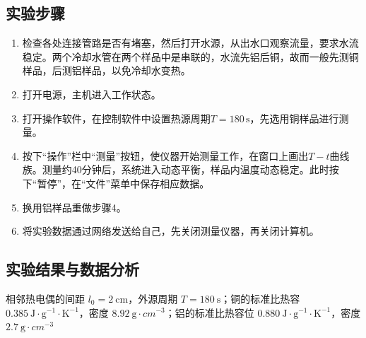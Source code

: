 \documentclass[UTF8]{article}
\theoremstyle{MyLineTheoremStyle} %
\theoremstyle{MyBlockTheoremStyle} %
\theoremstyle{MySubsubsectionStyle} %
\begin{document}
\subsection{实验步骤}
\begin{enumerate}
\item 检查各处连接管路是否有堵塞，然后打开水源，从出水口观察流量，要求水流稳定。两个冷却水管在两个样品中是串联的，水流先铝后铜，故而一般先测铜样品，后测铝样品，以免冷却水变热。
\item 打开电源，主机进入工作状态。
\item 打开操作软件，在控制软件中设置热源周期$ T=180\,\mathrm s $，先选用铜样品进行测量。
\item 按下“操作”栏中“测量”按钮，使仪器开始测量工作，在窗口上画出$ T-t $曲线族。测量约40分钟后，系统进入动态平衡，样品内温度动态稳定。此时按下“暂停”，在“文件”菜单中保存相应数据。
\item 换用铝样品重做步骤4。
\item 将实验数据通过网络发送给自己，先关闭测量仪器，再关闭计算机。
\end{enumerate}

\subsection{实验结果与数据分析}

相邻热电偶的间距 $l_0 = 2 \ \mathrm{cm}$，外源周期 $T = 180 \ \mathrm{s}$；铜的标准比热容 $0.385 \ \mathrm{J\cdot g^{-1} \cdot K^{-1}}$，密度 $8.92 \ \mathrm{g}\cdot cm^{-3}$；铝的标准比热容位 $0.880 \ \mathrm{J\cdot g^{-1} \cdot K^{-1}}$，密度 $2.7 \ \mathrm{g}\cdot cm^{-3}$
\end{document}
